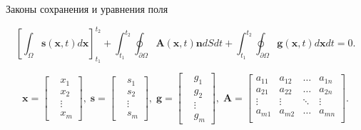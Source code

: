 \documentclass[10pt,xcolor=pst,aspectratio=169]{beamer}
\begin{document}
\begin{frame}{Законы сохранения и уравнения поля}

    \transdissolve[duration=0.1]
    \justifying
    \large

    \[
        \left[ \int_{\Omega} \mathbf{s} \left( \mathbf{x}, t \right) d \mathbf{x} \right]^{t_{2}}_{t_{1}}
        + \int^{t_{2}}_{t_{1}} \oint_{\partial \Omega} \mathbf{A} \left( \mathbf{x}, t \right) \mathbf{n} d S d t
        + \int^{t_{2}}_{t_{1}} \oint_{\partial \Omega} \mathbf{g} \left( \mathbf{x}, t \right) d \mathbf{x} d t
        =
        0.
    \]

    \[
        \mathbf{x}
        =
        \left[
            \begin{split}
                &x_{1}\\
                &x_{2}\\
                &\vdots\\
                &x_{m}
            \end{split}
        \right], \;
        \mathbf{s}
        =
        \left[
            \begin{split}
                &s_{1}\\
                &s_{2}\\
                &\vdots\\
                &s_{m}
            \end{split}
        \right], \;
        \mathbf{g}
        =
        \left[
            \begin{split}
                &g_{1}\\
                &g_{2}\\
                &\vdots\\
                &g_{m}
            \end{split}
        \right], \;
        \mathbf{A}
        =
        \begin{bmatrix} 
            a_{11} & a_{12} & \ldots & a_{1n} \\
            a_{21} & a_{22} & \ldots & a_{2n} \\
            \vdots & \vdots & \ddots & \vdots \\
            a_{m1} & a_{m2} & \ldots & a_{mn} \\
        \end{bmatrix}.
    \]

\end{frame}
\end{document}
